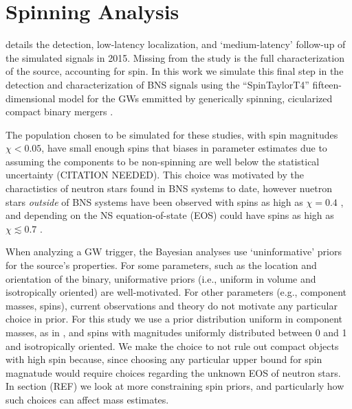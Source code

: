 \section{Spinning Analysis}

\citet{Singer_2014} details the detection, low-latency localization, and `medium-latency' follow-up of the simulated signals in 2015.  Missing from the study is the full characterization of the source, accounting for spin.  In this work we simulate this final step in the detection and characterization of BNS signals using the ``SpinTaylorT4'' fifteen-dimensional model for the GWs emmitted by generically spinning, cicularized compact binary mergers \cite{Buonanno_2003,Buonanno_2009}. 

The population chosen to be simulated for these studies, with spin magnitudes $\chi < 0.05$, have small enough spins that biases in parameter estimates due to assuming the components to be non-spinning are well below the statistical uncertainty (CITATION NEEDED).  This choice was motivated by the charactistics of neutron stars found in BNS systems to date, however nuetron stars \emph{outside} of BNS systems have been observed with spins as high as $\chi = 0.4$ \cite{Hessels_2006,Brown_2012}, and depending on the NS equation-of-state (EOS) could have spins as high as $\chi \lesssim 0.7$ \cite{Lo_2011}.

When analyzing a GW trigger, the Bayesian analyses use `uninformative' priors for the source's properties.  For some parameters, such as the location and orientation of the binary, uniformative priors (i.e., uniform in volume and isotropically oriented) are well-motivated.  For other parameters (e.g., component masses, spins), current observations and theory do not motivate any particular choice in prior.  For this study we use a prior distribution uniform in component masses, as in \citet{2013arXiv1304.0670L}, and spins with magnitudes uniformly distributed between 0 and 1 and isotropically oriented.  We make the choice to not rule out compact objects with high spin because, since choosing any particular upper bound for spin magnatude would require choices regarding the unknown EOS of neutron stars.  In section (REF) we look at more constraining spin priors, and particularly how such choices can affect mass estimates.